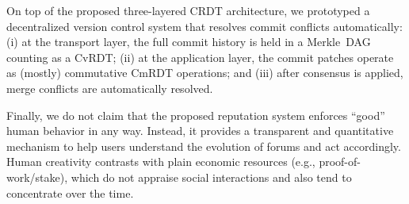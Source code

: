\documentclass[10pt,journal,compsoc]{IEEEtran}
\newcommand{\reps}     {\emph{reps}\xspace}
\begin{document}
On top of the proposed three-layered CRDT architecture, we prototyped a
decentralized version control system that resolves commit conflicts
automatically:
    (i)   at the transport layer, the full commit history is held in a
          Merkle~DAG counting as a CvRDT;
    (ii)  at the application layer, the commit patches operate as (mostly)
          commutative CmRDT operations; and
    (iii) after consensus is applied, merge conflicts are automatically
          resolved.

Finally, we do not claim that the proposed reputation system enforces ``good''
human behavior in any way.
Instead, it provides a transparent and quantitative mechanism to help users
understand the evolution of forums and act accordingly.
Human creativity contrasts with plain economic resources (e.g.,
proof-of-work/stake), which do not appraise social interactions and also tend
to concentrate over the time.
%

\end{document}
